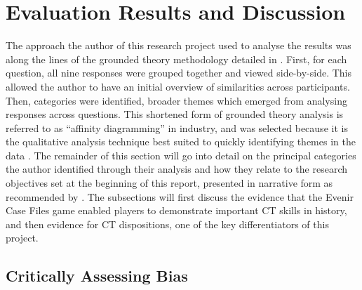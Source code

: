 \documentclass{l4proj}
\begin{document}
\section{Evaluation Results and Discussion}

The approach the author of this research project used to analyse the results was along the lines of the grounded theory methodology detailed in \citet{charmaz2007grounded}. First, for each question, all nine responses were grouped together and viewed side-by-side. This allowed the author to have an initial overview of similarities across participants. Then, categories were identified, broader themes which emerged from analysing responses across questions. This shortened form of grounded theory analysis is referred to as “affinity diagramming” in industry, and was selected because it is the qualitative analysis technique best suited to quickly identifying themes in the data \citep{NNGthematic}. The remainder of this section will go into detail on the principal categories the author identified through their analysis and how they relate to the research objectives set at the beginning of this report, presented in narrative form as recommended by \citet{charmaz2007grounded}. The subsections will first discuss the evidence that the Evenir Case Files game enabled players to demonstrate important CT skills in history, and then evidence for CT dispositions, one of the key differentiators of this project. 

\subsection{Critically Assessing Bias}
\end{document}
